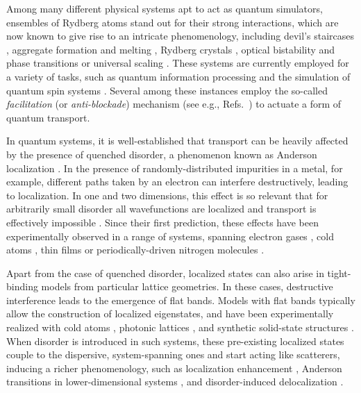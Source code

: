 \documentclass[prl,aps,twocolumn,showpacs,superscriptaddress,longbibliography]{revtex4-1}
\begin{document}
Among many different physical systems apt to act as quantum simulators, ensembles of Rydberg atoms \cite{a_Saffman_RMP_10, Low_2012, Gallagher_1994} stand out for their strong interactions, which are now known to give rise to an intricate phenomenology, including devil's staircases \cite{Weimer2010, Levi2016, Lan2015}, aggregate formation and melting \cite{Schempp2014, Lan2016}, Rydberg crystals \cite{Schauss_2015}, optical bistability \cite{Carr2013, Sibalic2016} and phase transitions or universal scaling \cite{Low2009, Marcuzzi2014, Gutierrez2015}. These systems are currently employed for a variety of tasks, such as quantum information processing \cite{Jaksch2000,Weimer_2010,Saffman_2016} and the simulation of quantum spin systems \cite{Labuhn_2015, Schauss_2015}. Several among these instances employ the so-called \emph{facilitation} (or \emph{anti-blockade}) mechanism (see e.g., Refs.~\cite{Ates_2007,Amthor_2010,Garttner_2013,schonleber2014,Lesanovsky_2014,Urvoy_2015,Valado_2016}) to actuate a form of quantum transport.



In quantum systems, it is well-established that transport can be heavily affected by the presence of quenched disorder, a phenomenon known as Anderson localization \cite{Anderson1958}. In the presence of randomly-distributed impurities in a metal, for example, different paths taken by an electron can interfere destructively, leading to localization. In one and two dimensions, this effect is so relevant that for arbitrarily small disorder all wavefunctions are localized and transport is effectively impossible \cite{Mott1961,Ishii1973}. Since their first prediction, these effects have been experimentally observed in a range of systems, spanning electron gases \cite{Cutler:1969}, cold atoms \cite{Billy:2008,Roati:2008,Semeghini:2015}, thin films \cite{Liao:2015} or periodically-driven nitrogen molecules \cite{Bitter:2016}.


Apart from the case of quenched disorder, localized states can also arise in tight-binding models from particular lattice geometries. In these cases, destructive interference leads to the emergence of flat bands. Models with flat bands typically allow the construction of localized eigenstates, and have been experimentally realized with cold atoms \cite{Shen2010}, photonic lattices \cite{Mukherjee2015}, and synthetic solid-state structures \cite{slot2017, drost2017}. When disorder is introduced in such systems, these pre-existing localized states couple to the dispersive, system-spanning ones and start acting like scatterers, inducing a richer phenomenology, such as localization enhancement \cite{Leykam2017}, Anderson transitions in lower-dimensional systems \cite{Bodyfelt2014}, and disorder-induced delocalization \cite{Goda2006}.
\end{document}
